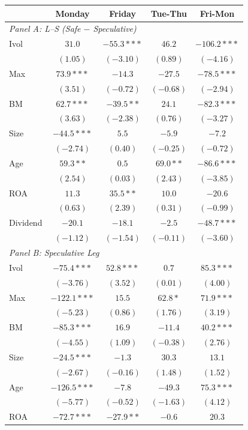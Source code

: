 \centering
\footnotesize
\begin{tabular}{l c c c c}
\toprule
 & Monday & Friday & Tue-Thu & Fri-Mon \\
\midrule
\multicolumn{5}{l}{\textit{Panel A: L--S (Safe $-$ Speculative)}} \\
Ivol & $31.0$ & $-55.3***$ & $46.2$ & $-106.2***$ \\
 & $(1.05)$ & $(-3.10)$ & $(0.89)$ & $(-4.16)$ \\
Max & $73.9***$ & $-14.3$ & $-27.5$ & $-78.5***$ \\
 & $(3.51)$ & $(-0.72)$ & $(-0.68)$ & $(-2.94)$ \\
BM & $62.7***$ & $-39.5**$ & $24.1$ & $-82.3***$ \\
 & $(3.63)$ & $(-2.38)$ & $(0.76)$ & $(-3.27)$ \\
Size & $-44.5***$ & $5.5$ & $-5.9$ & $-7.2$ \\
 & $(-2.74)$ & $(0.40)$ & $(-0.25)$ & $(-0.72)$ \\
Age & $59.3**$ & $0.5$ & $69.0**$ & $-86.6***$ \\
 & $(2.54)$ & $(0.03)$ & $(2.43)$ & $(-3.85)$ \\
ROA & $11.3$ & $35.5**$ & $10.0$ & $-20.6$ \\
 & $(0.63)$ & $(2.39)$ & $(0.31)$ & $(-0.99)$ \\
Dividend & $-20.1$ & $-18.1$ & $-2.5$ & $-48.7***$ \\
 & $(-1.12)$ & $(-1.54)$ & $(-0.11)$ & $(-3.60)$ \\
\midrule
\multicolumn{5}{l}{\textit{Panel B: Speculative Leg}} \\
Ivol & $-75.4***$ & $52.8***$ & $0.7$ & $85.3***$ \\
 & $(-3.76)$ & $(3.52)$ & $(0.01)$ & $(4.00)$ \\
Max & $-122.1***$ & $15.5$ & $62.8*$ & $71.9***$ \\
 & $(-5.23)$ & $(0.86)$ & $(1.76)$ & $(3.19)$ \\
BM & $-85.3***$ & $16.9$ & $-11.4$ & $40.2***$ \\
 & $(-4.55)$ & $(1.09)$ & $(-0.38)$ & $(2.76)$ \\
Size & $-24.5***$ & $-1.3$ & $30.3$ & $13.1$ \\
 & $(-2.67)$ & $(-0.16)$ & $(1.48)$ & $(1.52)$ \\
Age & $-126.5***$ & $-7.8$ & $-49.3$ & $75.3***$ \\
 & $(-5.77)$ & $(-0.52)$ & $(-1.63)$ & $(4.12)$ \\
ROA & $-72.7***$ & $-27.9**$ & $-0.6$ & $20.3$ \\

\end{tabular}

